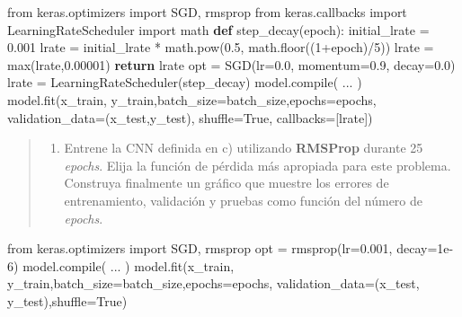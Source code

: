 \documentclass[11pt]{article}
\providecommand{\tightlist}{%
      \setlength{\itemsep}{0pt}\setlength{\parskip}{0pt}}
\newenvironment{Shaded}{}{}
\newcommand{\KeywordTok}[1]{\textcolor[rgb]{0.00,0.44,0.13}{\textbf{{#1}}}}
\newcommand{\DecValTok}[1]{\textcolor[rgb]{0.25,0.63,0.44}{{#1}}}
\newcommand{\FloatTok}[1]{\textcolor[rgb]{0.25,0.63,0.44}{{#1}}}
\newcommand{\NormalTok}[1]{{#1}}
\newcommand{\ImportTok}[1]{{#1}}
\newcommand{\VariableTok}[1]{\textcolor[rgb]{0.10,0.09,0.49}{{#1}}}
\newcommand{\ControlFlowTok}[1]{\textcolor[rgb]{0.00,0.44,0.13}{\textbf{{#1}}}}
\newcommand{\OperatorTok}[1]{\textcolor[rgb]{0.40,0.40,0.40}{{#1}}}
\newcommand{\BuiltInTok}[1]{{#1}}
\begin{document}
\begin{Shaded}
\begin{Highlighting}[]
\ImportTok{from}\NormalTok{ keras.optimizers }\ImportTok{import}\NormalTok{ SGD, rmsprop}
\ImportTok{from}\NormalTok{ keras.callbacks }\ImportTok{import}\NormalTok{ LearningRateScheduler}
\ImportTok{import}\NormalTok{ math}
\KeywordTok{def}\NormalTok{ step_decay(epoch):}
\NormalTok{    initial_lrate }\OperatorTok{=} \FloatTok{0.001}
\NormalTok{    lrate }\OperatorTok{=}\NormalTok{ initial_lrate }\OperatorTok{*}\NormalTok{ math.}\BuiltInTok{pow}\NormalTok{(}\FloatTok{0.5}\NormalTok{, math.floor((}\DecValTok{1}\OperatorTok{+}\NormalTok{epoch)}\OperatorTok{/}\DecValTok{5}\NormalTok{))}
\NormalTok{    lrate }\OperatorTok{=} \BuiltInTok{max}\NormalTok{(lrate,}\FloatTok{0.00001}\NormalTok{)}
    \ControlFlowTok{return}\NormalTok{ lrate}
\NormalTok{opt }\OperatorTok{=}\NormalTok{ SGD(lr}\OperatorTok{=}\FloatTok{0.0}\NormalTok{, momentum}\OperatorTok{=}\FloatTok{0.9}\NormalTok{, decay}\OperatorTok{=}\FloatTok{0.0}\NormalTok{)}
\NormalTok{lrate }\OperatorTok{=}\NormalTok{ LearningRateScheduler(step_decay)}
\NormalTok{model.}\BuiltInTok{compile}\NormalTok{( ... )}
\NormalTok{model.fit(x_train, y_train,batch_size}\OperatorTok{=}\NormalTok{batch_size,epochs}\OperatorTok{=}\NormalTok{epochs, validation_data}\OperatorTok{=}\NormalTok{(x_test,y_test), shuffle}\OperatorTok{=}\VariableTok{True}\NormalTok{, callbacks}\OperatorTok{=}\NormalTok{[lrate])}
\end{Highlighting}
\end{Shaded}

\begin{quote}
\begin{enumerate}
\def\labelenumi{\alph{enumi})}
\setcounter{enumi}{4}
\tightlist
\item
  Entrene la CNN definida en c) utilizando \textbf{RMSProp} durante 25
  \emph{epochs}. Elija la función de pérdida más apropiada para este
  problema. Construya finalmente un gráfico que muestre los errores de
  entrenamiento, validación y pruebas como función del número de
  \emph{epochs}.
\end{enumerate}
\end{quote}

\begin{Shaded}
\begin{Highlighting}[]
\ImportTok{from}\NormalTok{ keras.optimizers }\ImportTok{import}\NormalTok{ SGD, rmsprop}
\NormalTok{opt }\OperatorTok{=}\NormalTok{ rmsprop(lr}\OperatorTok{=}\FloatTok{0.001}\NormalTok{, decay}\OperatorTok{=}\FloatTok{1e-6}\NormalTok{)}
\NormalTok{model.}\BuiltInTok{compile}\NormalTok{( ... )}
\NormalTok{model.fit(x_train, y_train,batch_size}\OperatorTok{=}\NormalTok{batch_size,epochs}\OperatorTok{=}\NormalTok{epochs, validation_data}\OperatorTok{=}\NormalTok{(x_test, y_test),shuffle}\OperatorTok{=}\VariableTok{True}\NormalTok{)}
\end{Highlighting}
\end{Shaded}
\end{document}
